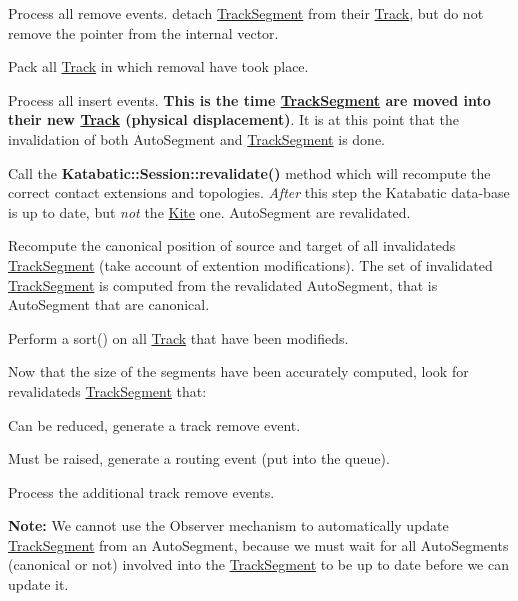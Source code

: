 \begin{DoxyItemize}
\item Process all remove events. detach \mbox{\hyperlink{classKite_1_1TrackSegment}{Track\+Segment}} from their \mbox{\hyperlink{classKite_1_1Track}{Track}}, but do not remove the pointer from the internal {\ttfamily vector}.
\item Pack all \mbox{\hyperlink{classKite_1_1Track}{Track}} in which removal have took place.
\item Process all insert events. {\bfseries This is the time \mbox{\hyperlink{classKite_1_1TrackSegment}{Track\+Segment}} are moved into their new \mbox{\hyperlink{classKite_1_1Track}{Track}} (physical displacement)}. It is at this point that the invalidation of both Auto\+Segment and \mbox{\hyperlink{classKite_1_1TrackSegment}{Track\+Segment}} is done.
\item Call the \textbf{ Katabatic\+::\+Session\+::revalidate()} method which will recompute the correct contact extensions and topologies. {\itshape After} this step the Katabatic data-\/base is up to date, but {\itshape not} the \mbox{\hyperlink{namespaceKite}{Kite}} one. Auto\+Segment are revalidated.
\item Recompute the canonical position of source and target of all invalidateds \mbox{\hyperlink{classKite_1_1TrackSegment}{Track\+Segment}} (take account of extention modifications). The set of invalidated \mbox{\hyperlink{classKite_1_1TrackSegment}{Track\+Segment}} is computed from the revalidated Auto\+Segment, that is Auto\+Segment that are canonical.
\item Perform a sort() on all \mbox{\hyperlink{classKite_1_1Track}{Track}} that have been modifieds.
\item Now that the size of the segments have been accurately computed, look for revalidateds \mbox{\hyperlink{classKite_1_1TrackSegment}{Track\+Segment}} that\+:
\begin{DoxyEnumerate}
\item Can be reduced, generate a track remove event.
\item Must be raised, generate a routing event (put into the queue).
\end{DoxyEnumerate}
\item Process the additional track remove events.
\end{DoxyItemize}

{\bfseries Note\+:} We cannot use the Observer mechanism to automatically update \mbox{\hyperlink{classKite_1_1TrackSegment}{Track\+Segment}} from an Auto\+Segment, because we must wait for all Auto\+Segments (canonical or not) involved into the \mbox{\hyperlink{classKite_1_1TrackSegment}{Track\+Segment}} to be up to date before we can update it.

